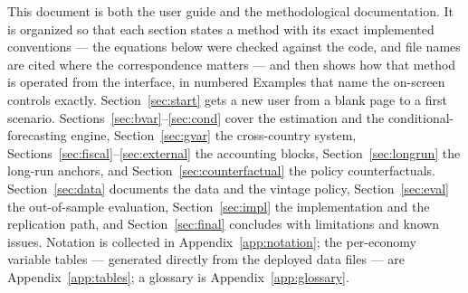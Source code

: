 \documentclass[11pt]{article}
\theoremstyle{plain}
\theoremstyle{remark}
\begin{document}
This document is both the user guide and the methodological
documentation. It is organized so that each section states a method with
its exact implemented conventions --- the equations below were checked
against the code, and file names are cited where the correspondence
matters --- and then shows how that method is operated from the
interface, in numbered Examples that name the on-screen controls
exactly. Section~\ref{sec:start} gets a new user from a blank page to a
first scenario. Sections~\ref{sec:bvar}--\ref{sec:cond} cover the
estimation and the conditional-forecasting engine,
Section~\ref{sec:gvar} the cross-country system,
Sections~\ref{sec:fiscal}--\ref{sec:external} the accounting blocks,
Section~\ref{sec:longrun} the long-run anchors, and
Section~\ref{sec:counterfactual} the policy counterfactuals.
Section~\ref{sec:data} documents the data and the vintage policy,
Section~\ref{sec:eval} the out-of-sample evaluation,
Section~\ref{sec:impl} the implementation and the replication path, and
Section~\ref{sec:final} concludes with limitations and known issues.
Notation is collected in Appendix~\ref{app:notation}; the per-economy
variable tables --- generated directly from the deployed data files ---
are Appendix~\ref{app:tables}; a glossary is Appendix~\ref{app:glossary}.
\end{document}
